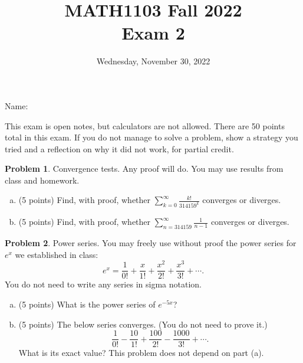 \documentclass[11pt,oneside]{amsart}
\title{MATH1103 Fall 2022\\
Exam 2}
\author{Wednesday, November 30, 2022}
\theoremstyle{definition}
\newtheorem{problem}{Problem}
\begin{document}
\maketitle

Name: \underline{\hspace{6cm}}

This exam is open notes, but calculators are not allowed. There are 50 points total in this exam. If you do not manage to solve a problem, show a strategy you tried and a reflection on why it did not work, for partial credit.

\begin{problem}
Convergence tests. Any proof will do. You may use results from class and homework.
\begin{enumerate}[(a)]
  \item (5 points) Find, with proof, whether $\displaystyle\sum_{k=0}^\infty \frac{k!}{314159^k}$ converges or diverges.
        \vfill
  \item (5 points) Find, with proof, whether $\displaystyle\sum_{n=314159}^\infty\frac 1{n-1}$ converges or diverges.
        \vfill
\end{enumerate}
\end{problem}

\newpage

\begin{problem}
Power series. You may freely use without proof the power series for $e^x$ we established in class:
\[e^x=\frac 1{0!}+\frac x{1!}+\frac{x^2}{2!}+\frac{x^3}{3!}+\cdots.\]
You do not need to write any series in sigma notation.
\begin{enumerate}[(a)]
  \item (5 points) What is the power series of $e^{-5x}$?
        \vfill
  \item (5 points) The below series converges. (You do not need to prove it.)
        \[\frac 1{0!}-\frac {10}{1!}+\frac {100}{2!}-\frac {1000}{3!}+\cdots.\]
        What is its exact value? This problem does not depend on part (a).
        \vfill

\end{enumerate}
\end{problem}
\end{document}
